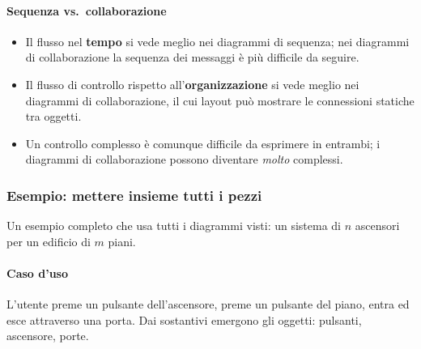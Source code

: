 \documentclass[a4paper,12pt]{article}
\begin{document}
\paragraph{Sequenza vs.\ collaborazione}
\begin{itemize}
  \item Il flusso nel \textbf{tempo} si vede meglio nei diagrammi di sequenza; nei
        diagrammi di collaborazione la sequenza dei messaggi è più difficile da seguire.
  \item Il flusso di controllo rispetto all'\textbf{organizzazione} si vede meglio nei
        diagrammi di collaborazione, il cui layout può mostrare le connessioni statiche
        tra oggetti.
  \item Un controllo complesso è comunque difficile da esprimere in entrambi; i
        diagrammi di collaborazione possono diventare \emph{molto} complessi.
\end{itemize}

\subsubsection{Esempio: mettere insieme tutti i pezzi}
Un esempio completo che usa tutti i diagrammi visti: un sistema di $n$ ascensori per un
edificio di $m$ piani.

\paragraph{Caso d'uso} L'utente preme un pulsante dell'ascensore, preme un pulsante del
piano, entra ed esce attraverso una porta. Dai sostantivi emergono gli oggetti:
pulsanti, ascensore, porte.
\end{document}
